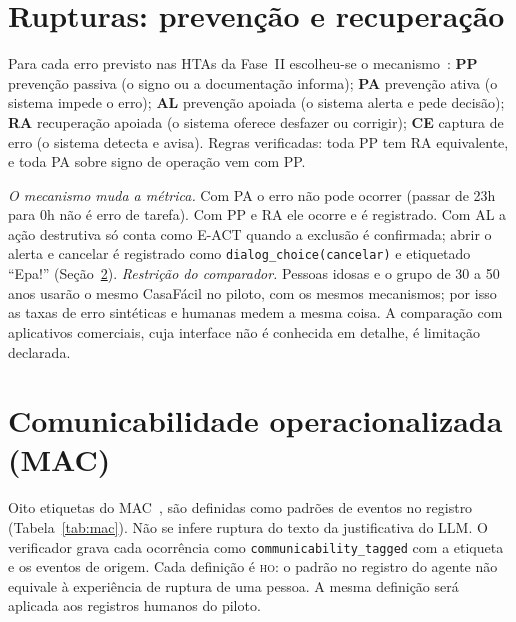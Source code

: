 \documentclass[conference,onecolumn]{IEEEtran}
\newcommand{\stHO}{\textsc{ho}}
\newcommand{\ev}[1]{\texttt{#1}}
\begin{document}
\section{Rupturas: prevenção e recuperação}\label{sec:rupturas}

Para cada erro previsto nas HTAs da Fase~II escolheu-se o mecanismo~\cite{barbosa2010}: \textbf{PP} prevenção passiva (o signo ou a documentação informa); \textbf{PA} prevenção ativa (o sistema impede o erro); \textbf{AL} prevenção apoiada (o sistema alerta e pede decisão); \textbf{RA} recuperação apoiada (o sistema oferece desfazer ou corrigir); \textbf{CE} captura de erro (o sistema detecta e avisa). Regras verificadas: toda PP tem RA equivalente, e toda PA sobre signo de operação vem com PP.

\begin{table}[!h]
\caption{Matriz de rupturas por operação da HTA}
\label{tab:rupturas}
\centering
\scriptsize

\end{table}

\textit{O mecanismo muda a métrica.} Com PA o erro não pode ocorrer (passar de 23h para 0h não é erro de tarefa). Com PP e RA ele ocorre e é registrado. Com AL a ação destrutiva só conta como E-ACT quando a exclusão é confirmada; abrir o alerta e cancelar é registrado como \ev{dialog\_choice(cancelar)} e etiquetado ``Epa!'' (Seção~\ref{sec:mac}). \textit{Restrição do comparador.} Pessoas idosas e o grupo de 30 a 50 anos usarão o mesmo CasaFácil no piloto, com os mesmos mecanismos; por isso as taxas de erro sintéticas e humanas medem a mesma coisa. A comparação com aplicativos comerciais, cuja interface não é conhecida em detalhe, é limitação declarada.

\section{Comunicabilidade operacionalizada (MAC)}\label{sec:mac}

Oito etiquetas do MAC~\cite{prates2000}, \cite{barbosa2010} são definidas como padrões de eventos no registro (Tabela~\ref{tab:mac}). Não se infere ruptura do texto da justificativa do LLM. O verificador grava cada ocorrência como \ev{communicability\_tagged} com a etiqueta e os eventos de origem. Cada definição é \stHO: o padrão no registro do agente não equivale à experiência de ruptura de uma pessoa. A mesma definição será aplicada aos registros humanos do piloto.
\end{document}
